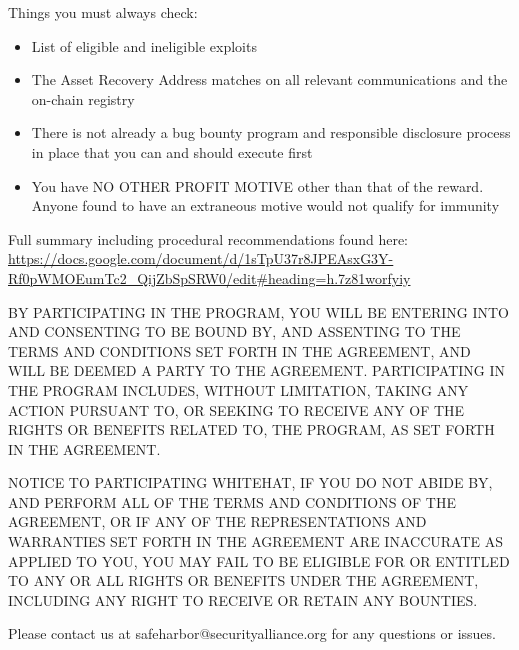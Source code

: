 \documentclass{article}
\begin{document}
Things you must always check:

\begin{itemize}
    \item List of eligible and ineligible exploits
    \item The Asset Recovery Address matches on all relevant communications and the on-chain registry
    \item There is not already a bug bounty program and responsible disclosure process in place that you can and should execute first
    \item You have NO OTHER PROFIT MOTIVE other than that of the reward. Anyone found to have an extraneous motive would not qualify for immunity
\end{itemize}


Full summary including procedural recommendations found here: \url{https://docs.google.com/document/d/1sTpU37r8JPEAsxG3Y-Rf0pWMOEumTc2_QijZbSpSRW0/edit#heading=h.7z81worfyiy}

\vspace{5mm}

BY PARTICIPATING IN THE PROGRAM, YOU WILL BE ENTERING INTO AND CONSENTING TO BE BOUND BY, AND ASSENTING TO THE TERMS AND CONDITIONS SET FORTH IN THE AGREEMENT, AND WILL BE DEEMED A PARTY TO THE AGREEMENT. PARTICIPATING IN THE PROGRAM INCLUDES, WITHOUT LIMITATION, TAKING ANY ACTION PURSUANT TO, OR SEEKING TO RECEIVE ANY OF THE RIGHTS OR BENEFITS RELATED TO, THE PROGRAM, AS SET FORTH IN THE AGREEMENT.

\vspace{5mm}

NOTICE TO PARTICIPATING WHITEHAT, IF YOU DO NOT ABIDE BY, AND PERFORM ALL OF THE TERMS AND CONDITIONS OF THE AGREEMENT, OR IF ANY OF THE REPRESENTATIONS AND WARRANTIES SET FORTH IN THE AGREEMENT ARE INACCURATE AS APPLIED TO YOU, YOU MAY FAIL TO BE ELIGIBLE FOR OR ENTITLED TO ANY OR ALL RIGHTS OR BENEFITS UNDER THE AGREEMENT, INCLUDING ANY RIGHT TO RECEIVE OR RETAIN ANY BOUNTIES.

\vspace{5mm}

Please contact us at safeharbor@securityalliance.org for any questions or issues.
\end{document}
